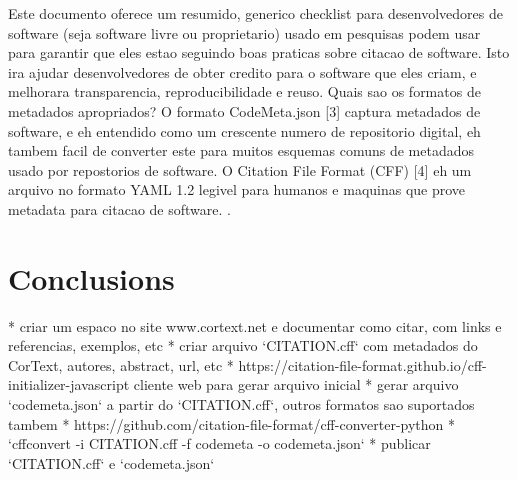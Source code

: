 \documentclass{article}
\begin{document}
Este documento oferece um resumido, generico checklist para desenvolvedores de software
(seja software livre ou proprietario) usado em pesquisas podem usar para garantir que eles
estao seguindo boas praticas sobre citacao de software. Isto ira ajudar desenvolvedores de
obter credito para o software que eles criam, e melhorara transparencia, reproducibilidade
e reuso.
Quais sao os formatos de metadados apropriados?
O formato CodeMeta.json [3]  captura metadados de software, e eh entendido como um crescente
numero de repositorio digital, eh tambem facil de converter este para muitos esquemas
comuns de metadados usado por repostorios de software.
O Citation File Format (CFF) [4] eh um arquivo no formato YAML 1.2 legivel para humanos e
maquinas que prove metadata para citacao de software.
\cite{chue_hong_software_2019}.

\section{Conclusions}

* criar um espaco no site www.cortext.net e documentar como citar, com links e referencias, exemplos, etc
* criar arquivo `CITATION.cff` com metadados do CorText, autores, abstract, url, etc
  * https://citation-file-format.github.io/cff-initializer-javascript cliente web para gerar arquivo inicial
* gerar arquivo `codemeta.json` a partir do `CITATION.cff`, outros formatos sao suportados tambem
  * https://github.com/citation-file-format/cff-converter-python
  * `cffconvert -i CITATION.cff -f codemeta -o codemeta.json`
* publicar `CITATION.cff` e `codemeta.json`



\end{document}
